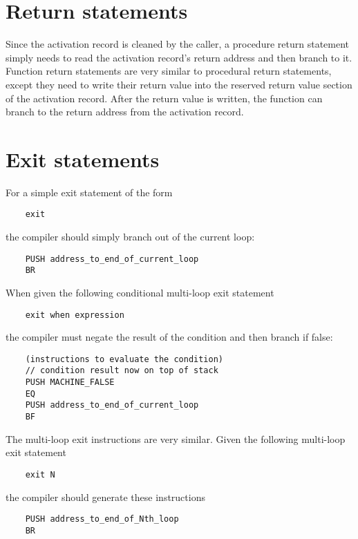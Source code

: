 \documentclass{article}
\begin{document}
\section{Return statements}
Since the activation record is cleaned by the caller, a procedure return statement simply needs to read the activation record's return address and then branch to it.
\newline
\newline
\noindent
Function return statements are very similar to procedural return statements, except they need to write their return value into the reserved return value section of the activation record. After the return value is written, the function can branch to the return address from the activation record.
\newline

\newpage
\section{Exit statements}

For a simple exit statement of the form
\begin{lstlisting}
    exit
\end{lstlisting}
the compiler should simply branch out of the current loop:
\begin{lstlisting}
    PUSH address_to_end_of_current_loop
    BR
\end{lstlisting}

\noindent
When given the following conditional multi-loop exit statement
\begin{lstlisting}
    exit when expression
\end{lstlisting}
the compiler must negate the result of the condition and then branch if false:
\begin{lstlisting}
    (instructions to evaluate the condition)
    // condition result now on top of stack
    PUSH MACHINE_FALSE
    EQ
    PUSH address_to_end_of_current_loop
    BF
\end{lstlisting}

\noindent
The multi-loop exit instructions are very similar.
Given the following multi-loop exit statement
\begin{lstlisting}
    exit N
\end{lstlisting}
the compiler should generate these instructions
\begin{lstlisting}
    PUSH address_to_end_of_Nth_loop
    BR
\end{lstlisting}
\end{document}
